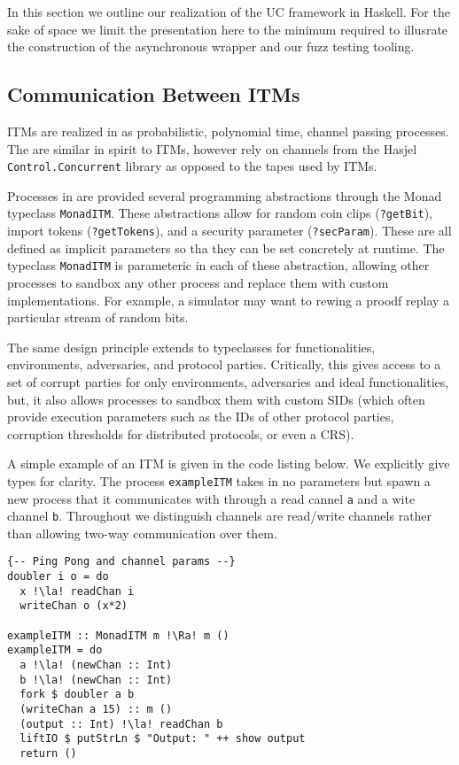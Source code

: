 In this section we outline our realization of the UC framework in Haskell.
For the sake of space we limit the presentation here to the minimum required to illusrate the construction of the asynchronous wrapper and our fuzz testing tooling. 

\subsection{Communication Between ITMs}
ITMs are realized in \us as probabilistic, polynomial time, channel passing processes. 
The are similar in spirit to ITMs, however rely on channels from the Hasjel \texttt{Control.Concurrent} library as opposed to the tapes used by ITMs. 

Processes in \us are provided several programming abstractions through the Monad typeclass \texttt{MonadITM}. 
These abstractions allow for random coin clips (\texttt{?getBit}), import tokens (\texttt{?getTokens}), and a security parameter (\texttt{?secParam}).
These are all defined as implicit parameters so tha they can be set concretely at runtime. 
The typeclass \texttt{MonadITM} is parameteric in each of these abstraction, allowing other processes to sandbox any other process and replace them with custom implementations.
For example, a simulator may want to rewing a proodf replay a particular stream of random bits.

The same design principle extends to typeclasses for functionalities, environments, adversaries, and protocol parties. 
Critically, this gives access to a set of corrupt parties for only environments, adversaries and ideal functionalities, but, it also allows processes to sandbox them with custom SIDs (which often provide execution parameters such as the IDs of other protocol parties, corruption thresholds for distributed protocols, or even a CRS).


A simple example of an ITM is given in the code listing below. We explicitly give types for clarity.
The process \texttt{exampleITM} takes in no parameters but spawn a new process that it communicates with through a read cannel \texttt{a} and a wite channel \texttt{b}.
Throughout \us we distinguish channels are read/write channels rather than allowing two-way communication over them. 

\begin{lstlisting}
{-- Ping Pong and channel params --}
doubler i o = do
  x !\la! readChan i
  writeChan o (x*2)

exampleITM :: MonadITM m !\Ra! m ()
exampleITM = do
  a !\la! (newChan :: Int)
  b !\la! (newChan :: Int)
  fork $ doubler a b
  (writeChan a 15) :: m ()
  (output :: Int) !\la! readChan b
  liftIO $ putStrLn $ "Output: " ++ show output
  return ()
\end{lstlisting}

